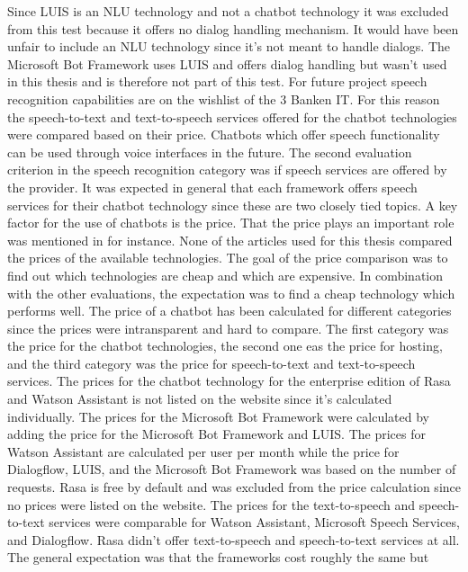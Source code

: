 Since LUIS is an NLU technology and not a chatbot technology it was excluded from this test
because it offers no dialog handling mechanism.
It would have been unfair to include an NLU technology since it's not meant to handle 
dialogs.
The Microsoft Bot Framework uses LUIS and offers dialog handling but wasn't used in 
this thesis and is therefore not part of this test.
For future project speech recognition capabilities are on the wishlist of the 
3 Banken IT.
For this reason the speech-to-text and text-to-speech services offered for the 
chatbot technologies were compared based on their price.
Chatbots which offer speech functionality can be used through 
voice interfaces in the future.
The second evaluation criterion in the speech recognition category was
if speech services are offered by the provider. 
It was expected in general that each framework offers speech services for their 
chatbot technology since these are two closely tied topics.
A key factor for the use of chatbots is the price.
That the price plays an important role was mentioned in \citet{buiildChatbotsPython} 
for instance.
None of the articles used for this thesis compared the prices of the 
available technologies.
The goal of the price comparison was to find out which technologies are cheap and which are 
expensive.
In combination with the other evaluations, the expectation was to find a cheap technology 
which performs well.
The price of a chatbot has been calculated for different categories since the 
prices were intransparent and hard to compare.
The first category was the price for the chatbot technologies, the second 
one eas the price for hosting, and the third category was the price 
for speech-to-text and text-to-speech services.
The prices for the chatbot technology for the enterprise edition of Rasa 
and Watson Assistant is not listed on the website since it's calculated 
individually.
The prices for the Microsoft Bot Framework were calculated by adding the price
for the Microsoft Bot Framework and LUIS.
The prices for Watson Assistant are calculated per user per month while the price for
Dialogflow, LUIS, and the Microsoft Bot Framework was based on the number of requests.
Rasa is free by default and was excluded from the price calculation since 
no prices were listed on the website.
The prices for the text-to-speech and speech-to-text services were comparable for
Watson Assistant, Microsoft Speech Services, and Dialogflow.
Rasa didn't offer text-to-speech and speech-to-text services at all.
The general expectation was that the frameworks cost roughly the same but 
